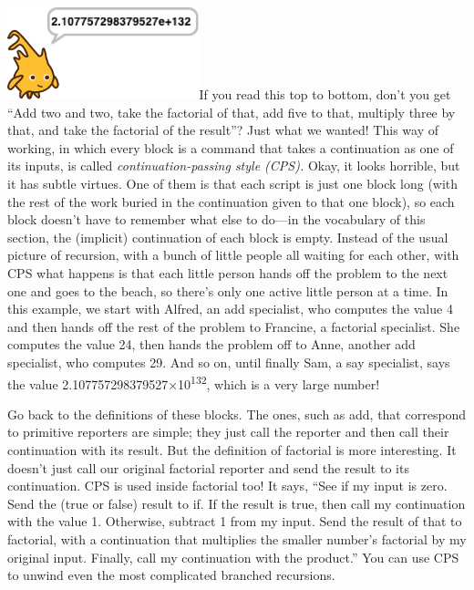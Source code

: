 \includegraphics[width=2.19306in,height=1.05278in]{media/image909.png}If
you read this top to bottom, don't you get ``Add two and two, take the
factorial of that, add five to that, multiply three by that, and take
the factorial of the result''? Just what we wanted! This way of working,
in which every block is a command that takes a continuation as one of
its inputs, is called \emph{continuation-passing style (CPS).} Okay, it
looks horrible, but it has subtle virtues. One of them is that each
script is just one block long (with the rest of the work buried in the
continuation given to that one block), so each block doesn't have to
remember what else to do---in the vocabulary of this section, the
(implicit) continuation of each block is empty. Instead of the usual
picture of recursion, with a bunch of little people all waiting for each
other, with CPS what happens is that each little person hands off the
problem to the next one and goes to the beach, so there's only one
active little person at a time. In this example, we start with Alfred,
an add specialist, who computes the value 4 and then hands off the rest
of the problem to Francine, a factorial specialist. She computes the
value 24, then hands the problem off to Anne, another add specialist,
who computes 29. And so on, until finally Sam, a say specialist, says
the value 2.107757298379527×10\textsuperscript{132}, which is a very
large number!

Go back to the definitions of these blocks. The ones, such as add, that
correspond to primitive reporters are simple; they just call the
reporter and then call their continuation with its result. But the
definition of factorial is more interesting. It doesn't just call our
original factorial reporter and send the result to its continuation. CPS
is used inside factorial too! It says, ``See if my input is zero. Send
the (true or false) result to if. If the result is true, then call my
continuation with the value 1. Otherwise, subtract 1 from my input. Send
the result of that to factorial, with a continuation that multiplies the
smaller number's factorial by my original input. Finally, call my
continuation with the product.'' You can use CPS to unwind even the most
complicated branched recursions.

